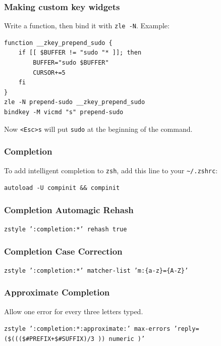 \documentclass{beamer}
\begin{document}
\begin{frame}[fragile]
    \frametitle{Making custom key widgets}
    Write a function, then bind it with \texttt{zle -N}. Example:

    \medskip

    \begin{verbatim}
function __zkey_prepend_sudo {
    if [[ $BUFFER != "sudo "* ]]; then
        BUFFER="sudo $BUFFER"
        CURSOR+=5
    fi
}
zle -N prepend-sudo __zkey_prepend_sudo
bindkey -M vicmd "s" prepend-sudo\end{verbatim}

    \medskip

    Now \texttt{<Esc>s} will put \texttt{sudo} at the beginning of the command.
\end{frame}

\begin{frame}
    \frametitle{Completion}
    To add intelligent completion to \texttt{zsh}, add this line to your
    \texttt{\textasciitilde/.zshrc}:

    \medskip
    \centering \Large
    \texttt{autoload -U compinit \&\& compinit}
\end{frame}

\begin{frame}
    \frametitle{Completion Automagic Rehash}
    \centering \Large
    \texttt{zstyle ':completion:*' rehash true}
\end{frame}

\begin{frame}
    \frametitle{Completion Case Correction}
    \centering
    \texttt{zstyle ':completion:*' matcher-list 'm:\{a-z\}=\{A-Z\}'}
\end{frame}

\begin{frame}
    \frametitle{Approximate Completion}
    \centering
    Allow one error for every three letters typed.

    \medskip
    \texttt{zstyle ':completion:*:approximate:' max-errors
    'reply=(\$(((\$\#PREFIX+\$\#SUFFIX)/3 )) numeric )'}
\end{frame}

\end{document}
